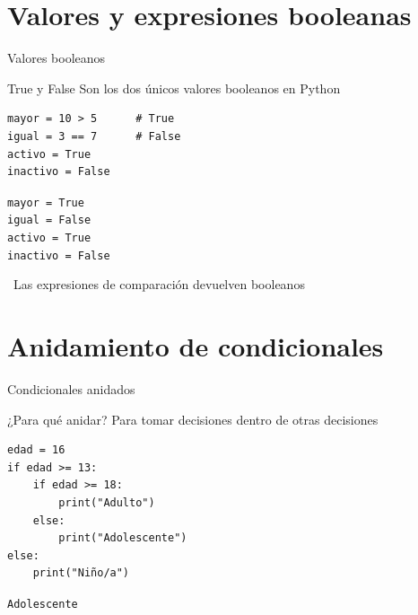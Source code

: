 \documentclass{beamer}
\begin{document}
\section{Valores y expresiones booleanas}

\begin{frame}[fragile]{Valores booleanos \ \faToggleOn}
\begin{conceptbox}{True y False}
Son los dos únicos valores booleanos en Python
\end{conceptbox}

\begin{lstlisting}
mayor = 10 > 5      # True
igual = 3 == 7      # False
activo = True
inactivo = False
\end{lstlisting}

\vspace{-0.2cm}
\begin{tcolorbox}[colback=green!10,colframe=green,title={\small\faArrowCircleRight \ Salida esperada},coltitle=fg0,left=3pt,right=3pt,top=2pt,bottom=2pt,boxsep=1pt]
\small\texttt{mayor = True\\
igual = False\\
activo = True\\
inactivo = False}
\end{tcolorbox}

\vspace{-0.1cm}
\begin{notebox}
\small\faLightbulb \ Las expresiones de comparación devuelven booleanos
\end{notebox}
\end{frame}

\section{Anidamiento de condicionales}

\begin{frame}[fragile]{Condicionales anidados \ \faSitemap}
\begin{conceptbox}{¿Para qué anidar?}
Para tomar decisiones dentro de otras decisiones
\end{conceptbox}

\begin{lstlisting}
edad = 16
if edad >= 13:
    if edad >= 18:
        print("Adulto")
    else:
        print("Adolescente")
else:
    print("Niño/a")
\end{lstlisting}

\vspace{-0.2cm}
\begin{tcolorbox}[colback=green!10,colframe=green,title={\small\faArrowCircleRight \ Salida},coltitle=fg0,left=3pt,right=3pt,top=2pt,bottom=2pt,boxsep=1pt]
\small\texttt{Adolescente}
\end{tcolorbox}
\end{frame}
\end{document}
